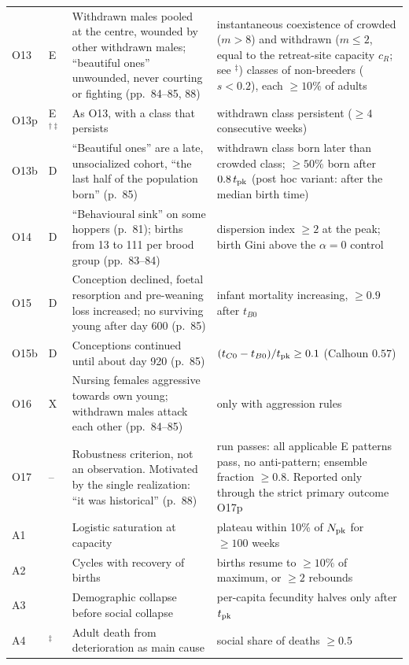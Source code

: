 \documentclass[preprint,12pt,authoryear]{elsarticle}
\begin{document}
{\begin{longtable}{@{}>{\raggedright\arraybackslash}p{}>{\raggedright\arraybackslash}p{}>{\raggedright\arraybackslash}p{}>{\raggedright\arraybackslash}p{}@{}}
O13 & E & Withdrawn males pooled at the centre, wounded by other withdrawn males; ``beautiful ones'' unwounded, never courting or fighting (pp.~84--85, 88) & instantaneous coexistence of crowded ($m>8$) and withdrawn ($m\le2$, equal to the retreat-site capacity $c_R$; see $^\ddagger$) classes of non-breeders ($s<0.2$), each $\ge 10\%$ of adults \\
O13p & E$^{\dagger\ddagger}$ & As O13, with a class that persists & withdrawn class persistent ($\ge4$ consecutive weeks) \\
O13b & D & ``Beautiful ones'' are a late, unsocialized cohort, ``the last half of the population born'' (p.~85) & withdrawn class born later than crowded class; $\ge 50\%$ born after $0.8\,t_{\rm pk}$ (post hoc variant: after the median birth time) \\
O14 & D & ``Behavioural sink'' on some hoppers (p.~81); births from 13 to 111 per brood group (pp.~83--84) & dispersion index $\ge 2$ at the peak; birth Gini above the $\alpha=0$ control \\
O15 & D & Conception declined, foetal resorption and pre-weaning loss increased; no surviving young after day 600 (p.~85) & infant mortality increasing, $\ge 0.9$ after $t_{B0}$ \\
O15b & D & Conceptions continued until about day 920 (p.~85) & $(t_{C0}-t_{B0})/t_{\rm pk}\ge 0.1$ (Calhoun $0.57$) \\
O16 & X & Nursing females aggressive towards own young; withdrawn males attack each other (pp.~84--85) & only with aggression rules \\
O17 & -- & Robustness criterion, not an observation. Motivated by the single realization: ``it was historical'' (p.~88) & run passes: all applicable E patterns pass, no anti-pattern; ensemble fraction $\ge 0.8$. Reported only through the strict primary outcome O17p \\
\midrule
A1 & & Logistic saturation at capacity & plateau within 10\% of $N_{\rm pk}$ for $\ge 100$ weeks \\
A2 & & Cycles with recovery of births & births resume to $\ge 10\%$ of maximum, or $\ge 2$ rebounds \\
A3 & & Demographic collapse before social collapse & per-capita fecundity halves only after $t_{\rm pk}$ \\
A4 & $^\ddagger$ & Adult death from deterioration as main cause & social share of deaths $\ge 0.5$ \\
\end{longtable}
}
\end{document}
